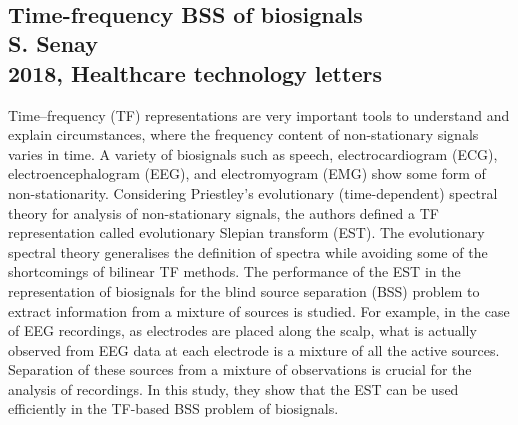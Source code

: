 \documentclass{article}
\begin{document}
\\


\subsection{Time-frequency BSS of biosignals \\
S. Senay \\
2018, Healthcare technology letters}
Time–frequency (TF) representations are very important tools to understand and explain circumstances, where the frequency content of non-stationary signals varies in time. A variety of biosignals such as speech, electrocardiogram (ECG), electroencephalogram (EEG), and electromyogram (EMG) show some form of non-stationarity. Considering Priestley's evolutionary (time-dependent) spectral theory for analysis of non-stationary signals, the authors defined a TF representation called evolutionary Slepian transform (EST). The evolutionary spectral theory generalises the definition of spectra while avoiding some of the shortcomings of bilinear TF methods. The performance of the EST in the representation of biosignals for the blind source separation (BSS) problem to extract information from a mixture of sources is studied. For example, in the case of EEG recordings, as electrodes are placed along the scalp, what is actually observed from EEG data at each electrode is a mixture of all the active sources. Separation of these sources from a mixture of observations is crucial for the analysis of recordings. In this study, they show that the EST can be used efficiently in the TF-based BSS problem of biosignals. \\

\end{document}
